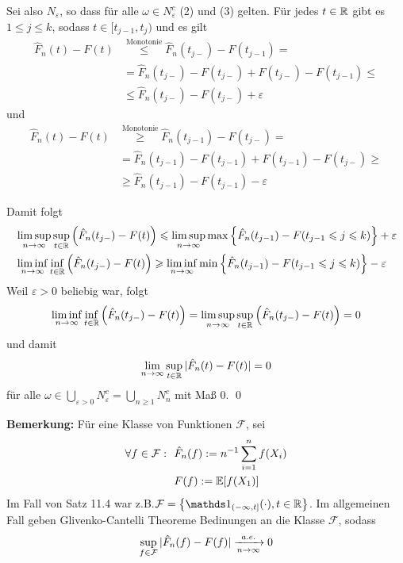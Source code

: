 \documentclass[11pt]{report}
\begin{document}
Sei also $N_\varepsilon$, so dass f\"ur alle $\omega\in N_\varepsilon^c$ (2) und (3) gelten. F\"ur jedes $t\in\mathbb{R}$ gibt es $1\leq j\leq k $, sodass $t\in[t_{j-1},t_j)$ und es gilt		
\begin{align*}
    \hat{F}_n(t)-F(t)&\stackrel{\text{Monotonie}}{\leq}\hat{F}_n(t_{j-})-F(t_{j-1}) =\\ 
    &=\hat{F}_n(t_{j-})-F(t_{j-})+F(t_{j-})-F(t_{j-1})\leq \\
    &\leq \hat{F}_n(t_{j-})-F(t_{j-})+\varepsilon
\end{align*}
und
\begin{align*}
    \hat{F}_n(t)-F(t)&\stackrel{\text{Monotonie}}{\geq}\hat{F}_n(t_{j-1})-F(t_{j-})= \\
    &=\hat{F}_n(t_{j-1})-F(t_{j-1})+F(t_{j-1})-F(t_{j-})\geq \\
    &\geq \hat{F}_n(t_{j-1})-F(t_{j-1})-\varepsilon
\end{align*}

Damit folgt
\begin{align*}
    &\limsup_{n\to\infty}\sup_{t\in\mathbb{R}}\left(
    \hat{F}_n(t_{j-})-F(t)\right)\leqslant\limsup_{n\to\infty}\max\left\{\hat{F}_n(t_{j-1})-F(t_{j-1}\leqslant j\leqslant k)\right\}+\varepsilon \\
    &\liminf_{n\to\infty}\inf_{t\in\mathbb{R}}\left(\hat{F}_n(t_{j-})-F(t)\right)\geqslant\liminf_{n\to\infty}\min\left\{\hat{F}_n(t_{j-1})-F(t_{j-1}\leqslant j\leqslant k)\right\}-\varepsilon
\end{align*}
Weil $\varepsilon>0$ beliebig war, folgt
	$$\liminf_{n\to\infty}\inf_{t\in\mathbb{R}}\left(\hat{F}_n(t_{j-})-F(t)\right)=\limsup_{n\to\infty}\sup_{t\in\mathbb{R}}\left(\hat{F}_n(t_{j-})-F(t)\right)=0$$
und damit
	$$\lim_{n\to\infty}\sup_{t\in\mathbb{R}}|\hat{F}_n(t)-F(t)|=0$$
f\"ur alle $\omega\in\displaystyle\bigcup_{\varepsilon>0}N_\varepsilon^c=\bigcup_{n\geq1}N_n^c$ mit
Ma\ss{} 0. \qed
\newline\newline

\textbf{Bemerkung:} F\"ur eine Klasse von Funktionen $\mathcal{F}$, sei 
\begin{align*}
    \forall f\in\mathcal{F}:  \ \ &\hat{F}_n(f):=n^{-1}\sum_{i=1}^nf(X_i)\\
    &F(f):=\E[f(X_1)]
\end{align*}
Im Fall von Satz 11.4 war z.B.$\mathcal{F}=\left\{\ind{(-\infty,t]}(\cdot),t\in\R\right\}$. Im allgemeinen Fall geben Glivenko-Cantelli Theoreme Bedinungen an die Klasse $\mathcal{F}$, sodass 
    $$\sup_{f\in\mathcal{F}}|\hat{F}_n(f)-F(f)|\nto{a.e.}{n\to\infty}0$$
\end{document}
